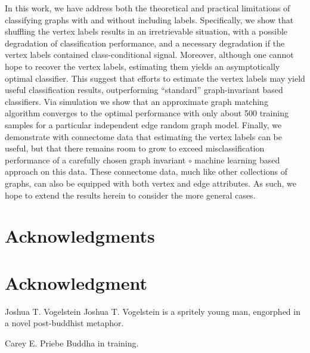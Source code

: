 \documentclass[10pt,journal,cspaper,compsoc]{IEEEtran}
\begin{document}
In this work, we have address both the theoretical and practical limitations of classifying graphs with and without including labels.  Specifically, we show that shuffling the vertex labels results in an irretrievable situation, with a possible degradation of classification performance, and a necessary degradation if the vertex labels contained class-conditional signal.  Moreover, although one cannot hope to recover the vertex labels, estimating them yields an asymptotically optimal classifier.  This suggest that efforts to estimate the vertex labels may yield useful classification results, outperforming ``standard'' graph-invariant based classifiers.  Via simulation we show that an approximate graph matching algorithm converges to the optimal performance with only about 500 training samples for a particular independent edge random graph model.   Finally, we demonstrate with connectome data that estimating the vertex labels can be useful, but that there remains room to grow to exceed misclassification performance of a carefully chosen graph invariant $\circ$ machine learning based approach on this data.   These connectome data, much like other collections of graphs, can also be equipped with both vertex and edge attributes.  As such, we hope to extend the results herein to consider the more general cases.








\ifCLASSOPTIONcompsoc
  \section*{Acknowledgments}
\else
  \section*{Acknowledgment}
\fi


\ifCLASSOPTIONcaptionsoff
  \newpage
\fi





\begin{IEEEbiography}{Joshua T. Vogelstein}
Joshua T. Vogelstein is a spritely young man, engorphed in a novel post-buddhist metaphor.

\end{IEEEbiography}




\begin{IEEEbiography}{Carey E. Priebe}
Buddha in training.
\end{IEEEbiography}

\end{document}
